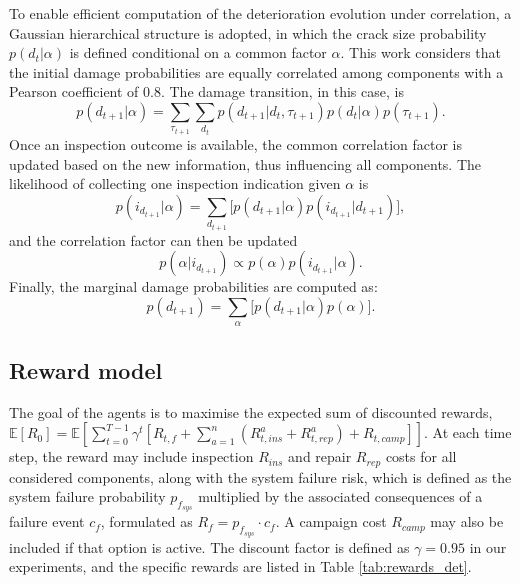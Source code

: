 To enable efficient computation of the deterioration evolution under correlation, a Gaussian hierarchical structure is adopted, in which the crack size probability $p(d_{t}|\alpha)$ is defined conditional on a common factor $\alpha$\citep{morato2022syst}. 
This work considers that the initial damage probabilities are equally correlated among components with a Pearson coefficient of 0.8. 
The damage transition, in this case, is
\begin{equation} \label{eq:ex_pod4}
    p(d_{t+1}|\alpha) =  \sum_{\tau_{t+1}} \sum_{d_t} p(d_{t+1}|d_t,\tau_{t+1}) p(d_{t}|\alpha) p(\tau_{t+1})   .
\end{equation}
Once an inspection outcome is available, the common correlation factor is updated based on the new information, thus influencing all components.
The likelihood of collecting one inspection indication given $\alpha$ is
\begin{equation}\label{Eq:margHyp}
p(i_{d_{t+1}}|\alpha)=\sum_{d_{t+1}} \Big[p(d_{t+1}|\alpha) p(i_{d_{t+1}}|d_{t+1})\Big]   ,
\end{equation}
and the correlation factor can then be updated
\begin{equation}\label{Eq:infHyp}
p(\alpha|i_{d_{t+1}}) \propto p(\alpha)p(i_{d_{t+1}}|\alpha) .
\end{equation}
Finally, the marginal damage probabilities are computed as:
\begin{equation}\label{Eq:margBel}
p(d_{t+1}) = \sum_{\alpha} \Big[p(d_{t+1}|\alpha)  p({\alpha}) \Big]   .
\end{equation}
 
\subsection{Reward model}\label{sec:ch5_rewardmodel}
The goal of the agents is to maximise the expected sum of discounted rewards, $\mathbb{E}[R_{0}] = \mathbb{E} \left[ \sum_{t=0}^{T-1} \gamma^t \left[ R_{t,f}+ \sum_{a=1}^n \left({R_{t,ins}^a} + {R_{t,rep}^a}\right)+R_{t,camp} \right] \right]$.
At each time step, the reward may include inspection $R_{ins}$ and repair $R_{rep}$ costs for all considered components, along with the system failure risk, which is defined as the system failure probability $p_{f_{sys}}$ multiplied by the associated consequences of a failure event $c_f$, formulated as $R_f = p_{f_{sys}} \cdot c_f$. A campaign cost $R_{camp}$ may also be included if that option is active.
The discount factor is defined as $\gamma=0.95$ in our experiments, and the specific rewards are listed in Table \ref{tab:rewards_det}.

